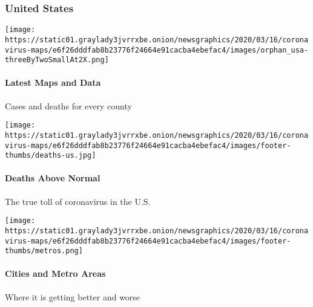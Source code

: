 \hypertarget{united-states}{%
\subsubsection{United States}\label{united-states}}

\href{https://www.nytimes3xbfgragh.onion/interactive/2020/us/coronavirus-us-cases.html}{}

\texttt{[image: https://static01.graylady3jvrrxbe.onion/newsgraphics/2020/03/16/coronavirus-maps/e6f26dddfab8b23776f24664e91cacba4ebefac4/images/orphan\_usa-threeByTwoSmallAt2X.png]}

\hypertarget{latest-maps-and-data}{%
\paragraph{Latest Maps and Data}\label{latest-maps-and-data}}

Cases and deaths for every county

\href{https://www.nytimes3xbfgragh.onion/interactive/2020/05/05/us/coronavirus-death-toll-us.html}{}

\texttt{[image: https://static01.graylady3jvrrxbe.onion/newsgraphics/2020/03/16/coronavirus-maps/e6f26dddfab8b23776f24664e91cacba4ebefac4/images/footer-thumbs/deaths-us.jpg]}

\hypertarget{deaths-above-normal}{%
\paragraph{Deaths Above Normal}\label{deaths-above-normal}}

The true toll of coronavirus in the U.S.

\href{https://www.nytimes3xbfgragh.onion/interactive/2020/04/23/upshot/five-ways-to-monitor-coronavirus-outbreak-us.html}{}

\texttt{[image: https://static01.graylady3jvrrxbe.onion/newsgraphics/2020/03/16/coronavirus-maps/e6f26dddfab8b23776f24664e91cacba4ebefac4/images/footer-thumbs/metros.png]}

\hypertarget{cities-and-metro-areas}{%
\paragraph{Cities and Metro Areas}\label{cities-and-metro-areas}}

Where it is getting better and worse

\href{https://www.nytimes3xbfgragh.onion/interactive/2020/us/coronavirus-testing.html}{}

